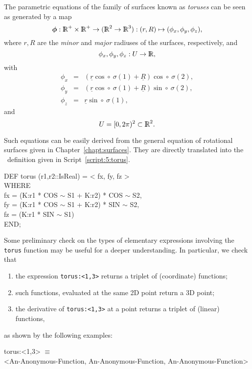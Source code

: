 \documentclass{31x47jw}
\begin{document}
\begin{example}
    
The parametric equations of the family of surfaces known as \emph{toruses}
can be seen as generated by a map
\[
\T{\phi}:\R^{+}\times\R^{+}\rightarrow(\R^{2}\rightarrow\R^{3}):
(r,R)\mapsto (\phi_{x}, \phi_{y}, \phi_{z}),
\]
where $r,R$ are the \emph{minor} and \emph{major} radiuses of the
surfaces, respectively, and  
\[
	\phi_{x}, \phi_{y}, \phi_{z} : U\rightarrow\mathbb{I\!\!R}, 
\]
with
\begin{eqnarray*}
    \phi_{x} &=& (\underline{r} \cos \circ\ \sigma(1) + \underline{R}) \cos 
			\circ\ \sigma(2), \\
	\phi_{y} &=& (\underline{r} \cos \circ\ \sigma(1) + \underline{R}) \sin \circ\ \sigma(2), \\
	\phi_{z} &=&  \underline{r} \sin \circ\ \sigma(1),
\end{eqnarray*}
and
\[
	U = [0,2\pi)^{2} \subset \mathbb{I\!\!R}^{2}.
\]

Such equations can be easily derived from the general equation of 
rotational surfaces given in Chapter~\ref{chapt:surfaces}. They are directly 
translated into the \pl\ definition given in Script~\ref{script:5:torus}.

\begin{script}[Torus]
\begin{smallplasm} 
DEF torus  (r1,r2::IsReal) = < fx, fy, fz >\\
WHERE\+\\
  fx = (K:r1 * COS $\sim$   S1 + K:r2) * COS $\sim$   S2,\\
  fy = (K:r1 * COS $\sim$   S1 + K:r2) * SIN $\sim$   S2,\\
  fz = (K:r1 * SIN $\sim$   S1)\-\\
END;
\end{smallplasm} 
\label{script:5:torus}
\end{script}

Some preliminary check on the types of elementary expressions
involving the \texttt{torus} function may be useful for a deeper
understanding.  In particular, we check that
\begin{enumerate}
    \item
    the expression \texttt{torus:<1,3>} returns a triplet of
    (coordinate) functions;
    \item
    such functions, evaluated at the same 2D point return
    a 3D point;
    \item
    the derivative of \texttt{torus:<1,3>} at a point returns a triplet
    of (linear) functions, 
\end{enumerate}
as shown by the following examples:
\begin{smallplasm} 
torus:<1,3> $\equiv$ \+\\
<An-Anonymous-Function, An-Anonymous-Function, 
     An-Anonymous-Function>\-\\[0.3cm]


\end{smallplasm}
\end{example}
\end{document}
